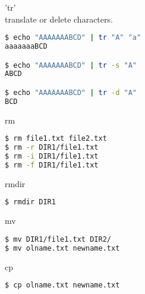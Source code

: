 \documentclass{beamer}
\begin{document}
\begin{frame}[fragile]
 \begin{center}
    \huge{'tr'}\\
     	translate or delete characters.\\
    \end{center}
\begin{lstlisting}[language=bash]
$ echo "AAAAAAABCD" | tr "A" "a"
aaaaaaaBCD

$ echo "AAAAAAABCD" | tr -s "A" 
ABCD

$ echo "AAAAAAABCD" | tr -d "A" 
BCD
\end{lstlisting}
\end{frame}

\begin{frame}[fragile]
 \begin{center}
    \huge{rm}\\
    \end{center}
\begin{lstlisting}[language=bash]
$ rm file1.txt file2.txt
$ rm -r DIR1/file1.txt
$ rm -i DIR1/file1.txt
$ rm -f DIR1/file1.txt
\end{lstlisting}
\end{frame}



\begin{frame}[fragile]
 \begin{center}
    \huge{rmdir}\\
    \end{center}
\begin{lstlisting}[language=bash]
$ rmdir DIR1
\end{lstlisting}
\end{frame}

\begin{frame}[fragile]
 \begin{center}
    \huge{mv}\\
    \end{center}
\begin{lstlisting}[language=bash]
$ mv DIR1/file1.txt DIR2/
$ mv olname.txt newname.txt
\end{lstlisting}
\end{frame}


\begin{frame}[fragile]
 \begin{center}
    \huge{cp}\\
    \end{center}
\begin{lstlisting}[language=bash]
$ cp olname.txt newname.txt
\end{lstlisting}
\end{frame}
\end{document}
